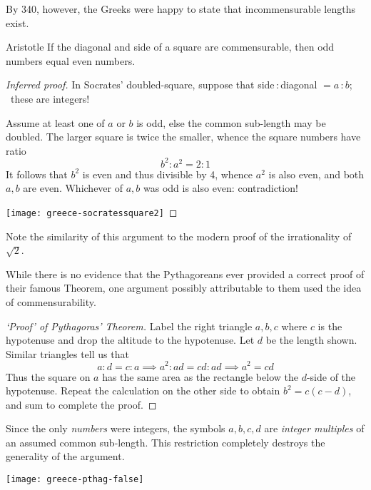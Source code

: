 By 340\BC, however, the Greeks were happy to state that incommensurable lengths exist.

\begin{thm*}{Aristotle}
	If the diagonal and side of a square are commensurable, then odd numbers equal even numbers.
\end{thm*}

\begin{proof}[Inferred proof]
	In Socrates' doubled-square, suppose that side\,:\,diagonal $=a$\,:\,$b$; \ these are integers!\par
	\begin{minipage}[t]{0.8\linewidth}\vspace{-5pt}
		Assume at least one of $a$ or $b$ is odd, else the common sub-length may be doubled. The larger square is twice the smaller, whence the square numbers have ratio
		\[
			b^2:a^2=2:1
		\]
		It follows that $b^2$ is even and thus divisible by 4, whence $a^2$ is also even, and both $a,b$ are even. Whichever of $a,b$ was odd is also even: contradiction!
	\end{minipage}
	\hfill
	\begin{minipage}[t]{0.18\linewidth}\vspace{-8pt}
		\flushright
		\texttt{[image: greece-socratessquare2]}
	\end{minipage}
\end{proof}
Note the similarity of this argument to the modern proof of the irrationality of $\sqrt 2$.\goodbreak

While there is no evidence that the Pythagoreans ever provided a correct proof of their famous Theorem, one argument possibly attributable to them used the idea of commensurability.

\begin{minipage}[t]{0.67\linewidth}\vspace{0pt}
	\begin{proof}[`Proof' of Pythagoras' Theorem]\label{pg:pythwrong}
		Label the right triangle $a,b,c$ where $c$ is the hypotenuse and drop the altitude to the hypotenuse. Let $d$ be the length shown. Similar triangles tell us that
		\[
			a:d=c:a\implies a^2:ad=cd:ad\implies a^2=cd
		\]
		Thus the square on $a$ has the same area as the rectangle below the $d$-side of the hypotenuse. Repeat the calculation on the other side to obtain $b^2=c(c-d)$, and sum to complete the proof.
	\end{proof}

	Since the only \emph{numbers} were integers, the symbols $a,b,c,d$ are \emph{integer multiples} of an assumed common sub-length. This restriction completely destroys the generality of the argument.
\end{minipage}
\hfill
\begin{minipage}[t]{0.32\linewidth}\vspace{0pt}
	\flushright
	\texttt{[image: greece-pthag-false]}\label{pthagorig}
\end{minipage}
\smallbreak

